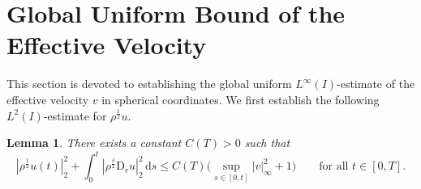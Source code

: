 \documentclass[11pt,reqno]{amsart}
\newtheorem{lem}{Lemma}[section]
\numberwithin{rk}{section}
\numberwithin{prop}{section}
\numberwithin{mydef}{section}
\numberwithin{lem}{section}
\numberwithin{equation}{section}
\numberwithin{thm}{section}
\begin{document}
\section{Global Uniform Bound of the Effective Velocity}\label{section-effective}

This section is devoted to establishing the global uniform $L^\infty(I)$-estimate of the effective velocity $v$ in spherical coordinates.  We first establish the following $L^2(I)$-estimate for $\rho^\frac{1}{2}u$.
\begin{lem}\label{rho u-L2}
There exists a constant $C(T)>0$ such that
\begin{equation*}
|\rho^\frac{1}{2}u(t)|_2^2+ \int_0^t|\rho^\frac{\delta}{2}\mathrm{D}_r u|_2^2\,\mathrm{d}s\leq C(T)\Big(\sup_{s\in [0,t]}|v|_\infty^2+1\Big)\qquad \text{for all $t\in [0,T]$}.
\end{equation*}
\end{lem}
\end{document}

